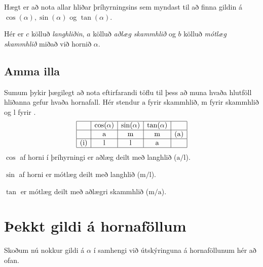 \documentclass[a4paper,10pt,icelandic]{sphinxmanual}
\begin{document}
Hægt er að nota allar hliðar þríhyrningsins sem myndast til að finna gildin á \(\cos(\alpha), \sin(\alpha)\) og \(\tan(\alpha)\).


Hér er \(c\) kölluð \textit{langhliðin}, \(a\) kölluð \textit{aðlæg skammhlið} og \(b\) kölluð \textit{mótlæg skammhlið} miðað við hornið \(\alpha\).


\subsection{Amma illa}
\label{\detokenize{Kafli07:amma-illa}}
Sumum þykir þægilegt að nota eftirfarandi töflu til þess að muna hvaða hlutföll hliðanna gefur hvaða hornafall.
Hér stendur \(\text{a}\) fyrir  skammhlið, \(\text{m}\) fyrir  skammhlið og \(\text{l}\) fyrir .
\begin{equation*}
\begin{split}\begin{array}{| c | c | c | c | c |}
        \hline
        & \cos(\alpha) & \sin(\alpha) & \tan(\alpha) & \\
        \hline
        & \text{a} &    \text{m} & \text{m} & \text{(a)}\\
        \hline
        \text{(i)} &    \text{l} & \text{l} & \text{a} &  \\
        \hline
\end{array}\end{split}
\end{equation*}
\(\cos\) af horni í þríhyrningi er aðlæg deilt með langhlið (\(\text{a}/\text{l}\)).

\(\sin\) af horni er mótlæg deilt með langhlið (\(\text{m}/\text{l}\)).

\(\tan\) er mótlæg deilt með aðlægri skammhlið (\(\text{m}/\text{a}\)).


\section{Þekkt gildi á hornaföllum}
\label{\detokenize{Kafli07:ekkt-gildi-a-hornafollum}}
Skoðum nú nokkur gildi á \(\alpha\) í samhengi við útskýringuna á hornaföllunum hér að ofan.
\end{document}

